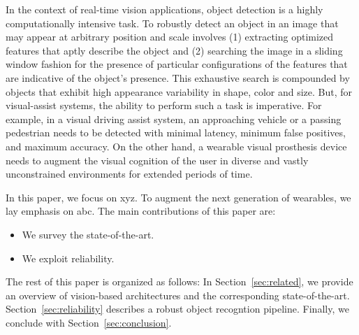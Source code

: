 In the context of real-time vision applications, object detection is a highly computationally intensive task.  
To robustly detect an object
in an image that may appear at arbitrary position and scale involves (1) extracting optimized features that aptly describe the object and (2) 
searching the image in a sliding window fashion for the presence of particular configurations of the features that are indicative of the object's presence. 
This exhaustive search is compounded by objects that exhibit high appearance variability in shape, color and size. 
But, for visual-assist systems, the ability to perform such a task is imperative. For example, in a visual driving
assist system, an approaching vehicle or a passing pedestrian needs to be detected
with minimal latency, minimum false positives, and maximum accuracy. On the other hand, a wearable visual prosthesis device needs to augment the visual cognition of the user 
in diverse and vastly unconstrained environments for extended periods of time.

In this paper, we focus on xyz.
To augment the next generation of wearables, we lay emphasis on abc.
The main contributions of this paper are:
\begin{itemize}
\item We survey the state-of-the-art. 
\item We exploit reliability. 
\end{itemize}

The rest of this paper is organized as follows:
In Section~\ref{sec:related}, we provide an overview of vision-based architectures and the corresponding state-of-the-art.
Section~\ref{sec:reliability} describes a robust object recogntion pipeline.
Finally, we conclude with Section~\ref{sec:conclusion}.


